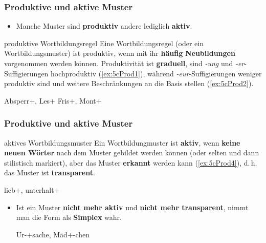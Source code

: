 \begin{frame}
\frametitle{Produktive und aktive Muster}

\begin{itemize}
\item Manche Muster sind \textbf{produktiv} andere lediglich \textbf{aktiv}.
\end{itemize}

\begin{block}{produktive Wortbildungsregel}
Eine Wortbildungsregel (oder ein Wortbildungsmuster) ist produktiv, wenn mit ihr \textbf{häufig} \textbf{Neubildungen} vorgenommen werden können. Produktivität ist \textbf{graduell}, \zB sind \emph{-ung} und \emph{-er}-Suffigierungen hochproduktiv (\ref{ex:5cProd1}), während \emph{-eur}-Suffigierungen weniger produktiv sind und weitere Beschränkungen an die Basis stellen (\ref{ex:5cProd2}). 
\hfill {}
\end{block}

\ea 
\ea \label{ex:5cProd1} Absperr$+$, Les$+$
\ex \label{ex:5cProd2} Fris$+$, Mont$+$ %
\z 
\z 

\end{frame}


\begin{frame}
\frametitle{Produktive und aktive Muster}

\begin{block}{aktives Wortbildungsmuster}
Ein Wortbildungmuster ist \textbf{aktiv}, wenn \textbf{keine neuen Wörter} nach dem Muster gebildet werden können (oder selten und dann stilistisch markiert), aber das Muster \textbf{erkannt} werden kann (\ref{ex:5cProd4}), d.\,h. das Muster ist \textbf{transparent}.
\end{block}

\ea \label{ex:5cProd4} lieb$+$, unterhalt$+$
\z 

\begin{itemize}
\item Ist ein Muster \textbf{nicht mehr aktiv} und \textbf{nicht mehr transparent}, nimmt man die Form als \textbf{Simplex} wahr.

\ea Ur-$+$sache, Mäd$+$-chen
\z 
\end{itemize}

\end{frame}



